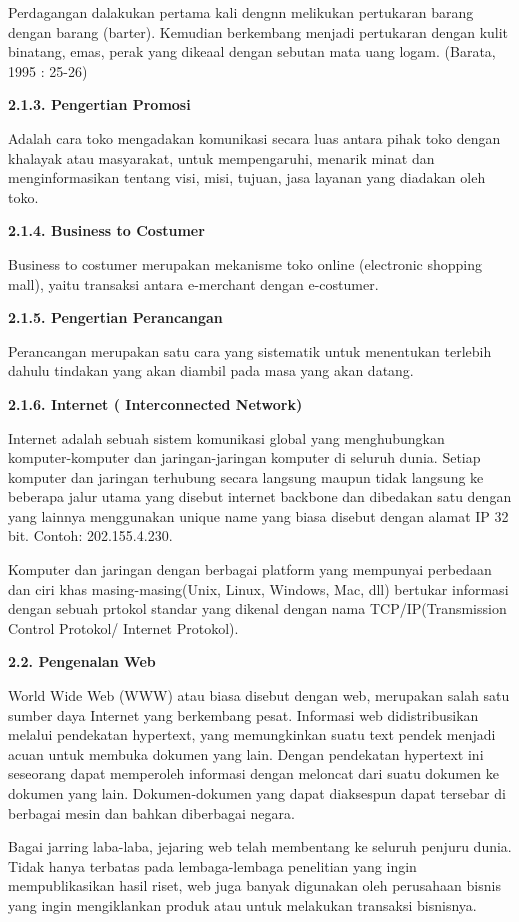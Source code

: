 \documentclass[11pt]{article}
\begin{document}
Perdagangan dalakukan pertama kali dengnn melikukan pertukaran barang dengan
barang (barter). Kemudian berkembang menjadi pertukaran dengan kulit binatang,
emas, perak yang dikeaal dengan sebutan mata uang logam. (Barata, 1995 : 25-26)

\textbf{2.1.3. Pengertian Promosi}

Adalah cara toko mengadakan komunikasi secara luas antara pihak toko dengan
khalayak atau masyarakat, untuk mempengaruhi, menarik minat dan menginformasikan
tentang visi, misi, tujuan, jasa layanan yang diadakan oleh toko.

\textbf{2.1.4. Business to Costumer}

Business to costumer merupakan mekanisme toko online (electronic shopping mall),
yaitu transaksi antara e-merchant dengan e-costumer.

\textbf{2.1.5. Pengertian Perancangan}

Perancangan merupakan satu cara yang sistematik untuk menentukan terlebih dahulu
tindakan yang akan diambil pada masa yang akan datang.

\textbf{2.1.6. Internet ( Interconnected Network)}

Internet adalah sebuah sistem komunikasi global yang menghubungkan komputer-komputer dan jaringan-jaringan komputer di seluruh dunia. Setiap komputer dan jaringan terhubung secara langsung maupun tidak langsung ke beberapa jalur utama yang disebut internet backbone dan dibedakan satu dengan yang lainnya menggunakan unique name yang biasa disebut dengan alamat IP 32 bit. Contoh: 202.155.4.230.

Komputer dan jaringan dengan berbagai platform yang mempunyai perbedaan dan ciri khas masing-masing(Unix, Linux, Windows, Mac, dll) bertukar informasi dengan sebuah prtokol standar yang dikenal dengan nama TCP/IP(Transmission Control Protokol/ Internet Protokol).


\textbf{2.2. Pengenalan Web}

World Wide Web (WWW) atau biasa disebut dengan web, merupakan salah satu sumber daya Internet yang berkembang pesat. Informasi web didistribusikan melalui pendekatan hypertext, yang memungkinkan suatu text pendek menjadi acuan untuk membuka dokumen yang lain. Dengan pendekatan hypertext ini seseorang dapat memperoleh informasi dengan meloncat dari suatu dokumen ke dokumen yang lain. Dokumen-dokumen yang dapat diaksespun dapat tersebar di berbagai mesin dan bahkan diberbagai negara.

Bagai jarring laba-laba, jejaring web telah membentang ke seluruh penjuru dunia. Tidak hanya terbatas pada lembaga-lembaga penelitian yang ingin mempublikasikan hasil riset, web juga banyak digunakan oleh perusahaan bisnis yang ingin mengiklankan produk atau untuk melakukan transaksi bisnisnya.
\end{document}
